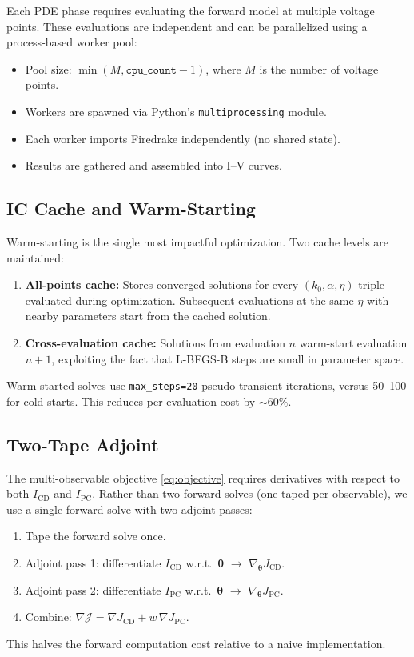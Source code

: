 \documentclass[11pt,a4paper]{article}
\newcommand{\vect}[1]{\boldsymbol{#1}}
\newcommand{\Jobj}{\mathcal{J}}
\begin{document}
Each PDE phase requires evaluating the forward model at multiple voltage
points. These evaluations are independent and can be parallelized using a
process-based worker pool:
\begin{itemize}
  \item Pool size: $\min(M, \texttt{cpu\_count} - 1)$, where $M$ is the
    number of voltage points.
  \item Workers are spawned via Python's \texttt{multiprocessing} module.
  \item Each worker imports Firedrake independently (no shared state).
  \item Results are gathered and assembled into I--V curves.
\end{itemize}

\subsection{IC Cache and Warm-Starting}\label{sec:cache}

Warm-starting is the single most impactful optimization. Two cache levels
are maintained:
\begin{enumerate}
  \item \textbf{All-points cache:} Stores converged solutions for every
    $(k_0, \alpha, \eta)$ triple evaluated during optimization. Subsequent
    evaluations at the same $\eta$ with nearby parameters start from the
    cached solution.
  \item \textbf{Cross-evaluation cache:} Solutions from evaluation $n$
    warm-start evaluation $n+1$, exploiting the fact that L-BFGS-B
    steps are small in parameter space.
\end{enumerate}
Warm-started solves use \texttt{max\_steps=20} pseudo-transient iterations,
versus 50--100 for cold starts. This reduces per-evaluation cost by
$\sim\!60\%$.

\subsection{Two-Tape Adjoint}\label{sec:two_tape}

The multi-observable objective \eqref{eq:objective} requires derivatives
with respect to both $I_{\mathrm{CD}}$ and $I_{\mathrm{PC}}$. Rather than
two forward solves (one taped per observable), we use a single forward
solve with two adjoint passes:
\begin{enumerate}
  \item Tape the forward solve once.
  \item Adjoint pass 1: differentiate $I_{\mathrm{CD}}$ w.r.t.\
    $\vect{\theta}$ $\to$ $\nabla_{\vect{\theta}} J_{\mathrm{CD}}$.
  \item Adjoint pass 2: differentiate $I_{\mathrm{PC}}$ w.r.t.\
    $\vect{\theta}$ $\to$ $\nabla_{\vect{\theta}} J_{\mathrm{PC}}$.
  \item Combine: $\nabla \Jobj = \nabla J_{\mathrm{CD}} + w\,\nabla J_{\mathrm{PC}}$.
\end{enumerate}
This halves the forward computation cost relative to a naive implementation.
\end{document}
